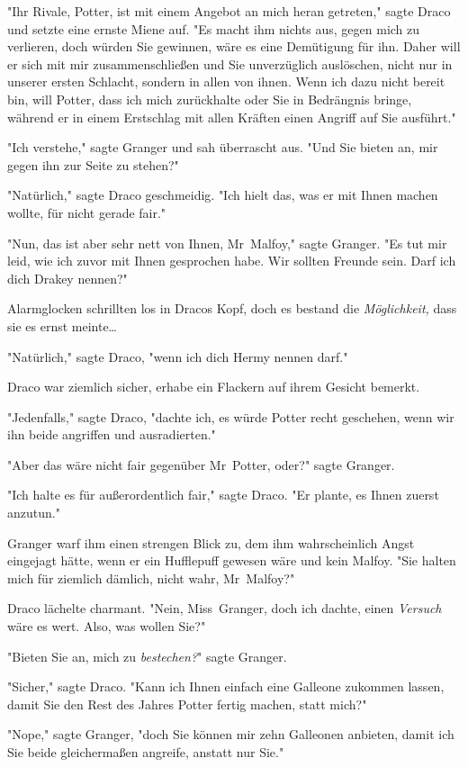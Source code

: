 {"Ihr Rivale, Potter, ist mit einem Angebot an mich heran getreten," sagte Draco und setzte eine ernste Miene auf. "Es macht ihm nichts aus, gegen mich zu verlieren, doch würden Sie gewinnen, wäre es eine Demütigung für ihn. Daher will er sich mit mir zusammenschließen und Sie unverzüglich auslöschen, nicht nur in unserer ersten Schlacht, sondern in allen von ihnen. Wenn ich dazu nicht bereit bin, will Potter, dass ich mich zurückhalte oder Sie in Bedrängnis bringe, während er in einem Erstschlag mit allen Kräften einen Angriff auf Sie ausführt."

"Ich verstehe," sagte Granger und sah überrascht aus. "Und Sie bieten an, mir gegen ihn zur Seite zu stehen?"

"Natürlich," sagte Draco geschmeidig. "Ich hielt das, was er mit Ihnen machen wollte, für nicht gerade fair."

"Nun, das ist aber sehr nett von Ihnen, Mr~Malfoy," sagte Granger. "Es tut mir leid, wie ich zuvor mit Ihnen gesprochen habe. Wir sollten Freunde sein. Darf ich dich Drakey nennen?"

Alarmglocken schrillten los in Dracos Kopf, doch es bestand die \emph{Möglichkeit,} dass sie es ernst meinte…

"Natürlich," sagte Draco, "wenn ich dich Hermy nennen darf."

Draco war ziemlich sicher, erhabe ein Flackern auf ihrem Gesicht bemerkt.

"Jedenfalls," sagte Draco, "dachte ich, es würde Potter recht geschehen, wenn wir ihn beide angriffen und ausradierten."

"Aber das wäre nicht fair gegenüber Mr~Potter, oder?" sagte Granger.

"Ich halte es für außerordentlich fair," sagte Draco. "Er plante, es Ihnen zuerst anzutun."

Granger warf ihm einen strengen Blick zu, dem ihm wahrscheinlich Angst eingejagt hätte, wenn er ein Hufflepuff gewesen wäre und kein Malfoy. "Sie halten mich für ziemlich dämlich, nicht wahr, Mr~Malfoy?"

Draco lächelte charmant. "Nein, Miss~Granger, doch ich dachte, einen \emph{Versuch} wäre es wert. Also, was wollen Sie?"

"Bieten Sie an, mich zu \emph{bestechen?}" sagte Granger.

"Sicher," sagte Draco. "Kann ich Ihnen einfach eine Galleone zukommen lassen, damit Sie den Rest des Jahres Potter fertig machen, statt mich?"

"Nope," sagte Granger, "doch Sie können mir zehn Galleonen anbieten, damit ich Sie beide gleichermaßen angreife, anstatt nur Sie."

}
